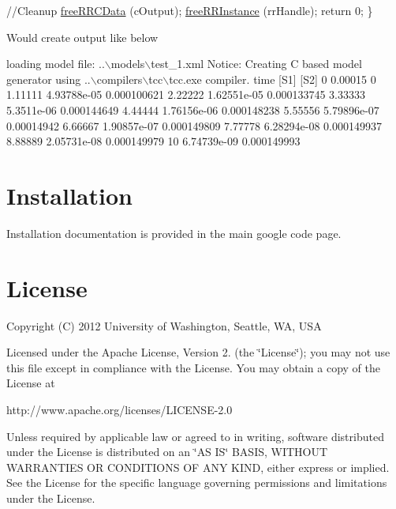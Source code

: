 \begin{DoxyCode}
    \textcolor{comment}{//Cleanup}
    \hyperlink{group__free_routines_ga96317bb0c9ad3daee01c9665cc14b223}{freeRRCData} (cOutput);
    \hyperlink{group__initialization_gaa085b3245183be2ee16a94dfe0de1751}{freeRRInstance} (rrHandle);
    \textcolor{keywordflow}{return} 0;
\}
\end{DoxyCode}


Would create output like below


\begin{DoxyCode}
loading model file: ..\(\backslash\)models\(\backslash\)test\_1.xml
Notice: Creating C based model generator \textcolor{keyword}{using} ..\(\backslash\)compilers\(\backslash\)tcc\(\backslash\)tcc.exe compiler.
time                    [S1]                    [S2]
0                       0.00015                 0
1.11111                 4.93788e-05             0.000100621
2.22222                 1.62551e-05             0.000133745
3.33333                 5.3511e-06              0.000144649
4.44444                 1.76156e-06             0.000148238
5.55556                 5.79896e-07             0.00014942
6.66667                 1.90857e-07             0.000149809
7.77778                 6.28294e-08             0.000149937
8.88889                 2.05731e-08             0.000149979
10                      6.74739e-09             0.000149993
\end{DoxyCode}
 \hypertarget{index_install_sec}{}\section{Installation}\label{index_install_sec}
Installation documentation is provided in the main google code page.\hypertarget{index_license_sec}{}\section{License}\label{index_license_sec}
Copyright (C) 2012 University of Washington, Seattle, W\-A, U\-S\-A

Licensed under the Apache License, Version 2. (the \char`\"{}\-License\char`\"{}); you may not use this file except in compliance with the License. You may obtain a copy of the License at \begin{DoxyVerb}http://www.apache.org/licenses/LICENSE-2.0
\end{DoxyVerb}


Unless required by applicable law or agreed to in writing, software distributed under the License is distributed on an \char`\"{}\-A\-S I\-S\char`\"{} B\-A\-S\-I\-S, W\-I\-T\-H\-O\-U\-T W\-A\-R\-R\-A\-N\-T\-I\-E\-S O\-R C\-O\-N\-D\-I\-T\-I\-O\-N\-S O\-F A\-N\-Y K\-I\-N\-D, either express or implied. See the License for the specific language governing permissions and limitations under the License.

